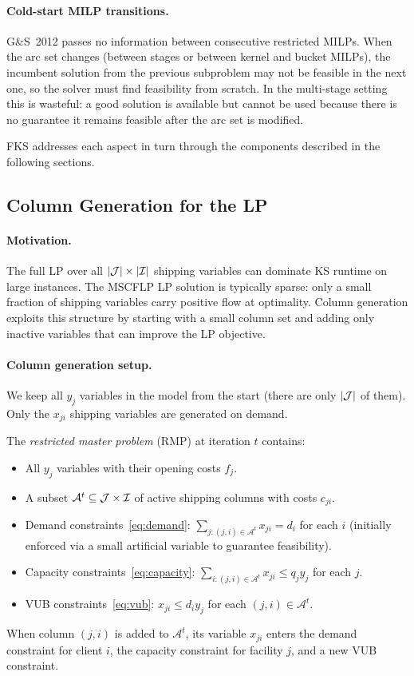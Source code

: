 \paragraph{Cold-start MILP transitions.}
G\&S~2012 passes no information between consecutive restricted MILPs.
When the arc set changes (between stages or between kernel and bucket MILPs),
the incumbent solution from the previous subproblem may not be feasible in the
next one, so the solver must find feasibility from scratch.
In the multi-stage setting this is wasteful: a good solution is available but
cannot be used because there is no guarantee it remains feasible after the
arc set is modified.

FKS addresses each aspect in turn through the components described in the
following sections.

\subsection{Column Generation for the LP}
\label{sec:cg}

\paragraph{Motivation.}
The full LP over all $|\mathcal{J}| \times |\mathcal{I}|$ shipping variables can dominate KS
runtime on large instances.
The MSCFLP LP solution is typically sparse: only a small fraction of shipping
variables carry positive flow at optimality.
Column generation exploits this structure by starting with a small column set and
adding only inactive variables that can improve the LP objective.

\paragraph{Column generation setup.}
We keep all $y_j$ variables in the model from the start (there are only
$|\mathcal{J}|$ of them).
Only the $x_{ji}$ shipping variables are generated on demand.

The \emph{restricted master problem} (RMP) at iteration $t$ contains:
\begin{itemize}
  \item All $y_j$ variables with their opening costs $f_j$.
  \item A subset $\mathcal{A}^t \subseteq \mathcal{J} \times \mathcal{I}$ of active
        shipping columns with costs $c_{ji}$.
  \item Demand constraints~\eqref{eq:demand}: $\sum_{j:(j,i)\in\mathcal{A}^t}
        x_{ji} = d_i$ for each $i$ (initially enforced via a small artificial
        variable to guarantee feasibility).
  \item Capacity constraints~\eqref{eq:capacity}: $\sum_{i:(j,i)\in\mathcal{A}^t}
        x_{ji} \leq q_j y_j$ for each $j$.
  \item VUB constraints~\eqref{eq:vub}: $x_{ji} \leq d_i y_j$ for each
        $(j,i) \in \mathcal{A}^t$.
\end{itemize}
When column $(j,i)$ is added to $\mathcal{A}^t$, its variable $x_{ji}$ enters
the demand constraint for client $i$, the capacity constraint for facility $j$,
and a new VUB constraint.

